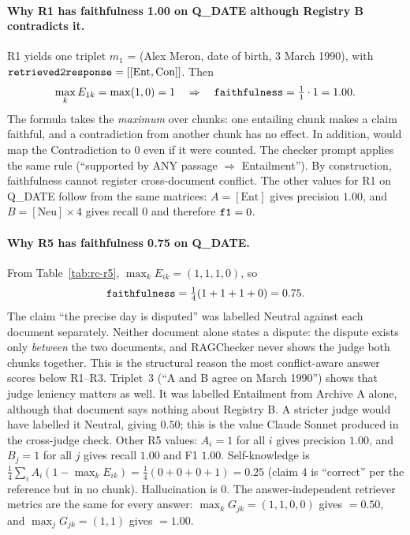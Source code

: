 \documentclass[11pt,a4paper]{article}
\newcommand{\code}[1]{\texttt{\detokenize{#1}}}
\begin{document}
\paragraph{Why R1 has faithfulness 1.00 on Q\_DATE although Registry B contradicts it.}
R1 yields one triplet $m_1$ = (Alex Meron, date of birth, 3 March 1990), with $\code{retrieved2response}=[[\text{Ent},\text{Con}]]$. Then
\[
\max_k E_{1k} = \max(1,0)=1 \quad\Rightarrow\quad \code{faithfulness}=\tfrac11\cdot 1 = 1.00 .
\]
The formula takes the \emph{maximum} over chunks: one entailing chunk makes a claim faithful, and a contradiction from another chunk has no effect. In addition, \code{to_bool} would map the Contradiction to 0 even if it were counted. The checker prompt applies the same rule (``supported by ANY passage $\Rightarrow$ Entailment''). By construction, faithfulness cannot register cross-document conflict. The other values for R1 on Q\_DATE follow from the same matrices: $A=[\text{Ent}]$ gives precision $1.00$, and $B=[\text{Neu}]\times4$ gives recall 0 and therefore $\code{f1}=0$.

\paragraph{Why R5 has faithfulness 0.75 on Q\_DATE.}
From Table~\ref{tab:rc-r5}, $\max_k E_{ik}=(1,1,1,0)$, so
\[
\code{faithfulness}=\tfrac14(1+1+1+0)=0.75 .
\]
The claim ``the precise day is disputed'' was labelled Neutral against each document separately. Neither document alone states a dispute: the dispute exists only \emph{between} the two documents, and RAGChecker never shows the judge both chunks together. This is the structural reason the most conflict-aware answer scores below R1--R3. Triplet~3 (``A and B agree on March 1990'') shows that judge leniency matters as well. It was labelled Entailment from Archive A alone, although that document says nothing about Registry B. A stricter judge would have labelled it Neutral, giving $0.50$; this is the value Claude Sonnet produced in the cross-judge check.
Other R5 values: $A_i=1$ for all $i$ gives precision $1.00$, and $B_j=1$ for all $j$ gives recall $1.00$ and F1 $1.00$. Self-knowledge is $\frac14\sum_i A_i(1-\max_kE_{ik})=\frac14(0+0+0+1)=0.25$ (claim 4 is ``correct'' per the reference but in no chunk). Hallucination is 0.
The answer-independent retriever metrics are the same for every answer: $\max_k G_{jk}=(1,1,0,0)$ gives \code{claim_recall} $=0.50$, and $\max_j G_{jk}=(1,1)$ gives \code{context_precision} $=1.00$.
\end{document}
